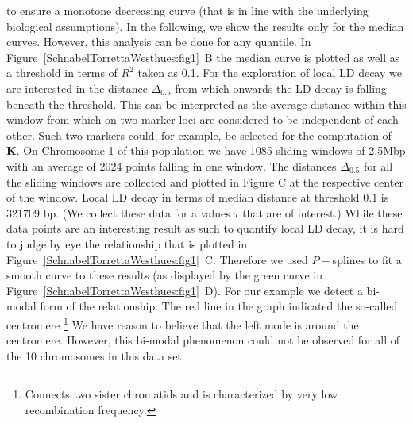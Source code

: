 \documentclass[twoside]{report}
\begin{document}
	to ensure a monotone decreasing curve (that is 
	in line with the underlying biological assumptions). In the following, we show the 
	results only for the median curves. However, this analysis can be done for any quantile.  
	In Figure~\ref{SchnabelTorrettaWesthues:fig1}~B the median curve is 
	plotted as well as a threshold in terms of $R^2$ taken as 
	0.1. For the exploration of local LD decay we are interested in the distance $\Delta_{0.5}$ from 
	which onwards the LD decay is falling beneath the threshold. This can be interpreted as the
	average distance within this window from which on two marker loci are considered to be 
	independent of each other. Such two markers could, for example, be selected for the computation
	of \textbf{K}.
	On Chromosome 1 of this population we have 1085 sliding windows
	 of 2.5Mbp with an 
	average of 2024 points falling in one window. The distances 
	$\Delta_{0.5}$ for all the sliding windows are collected and plotted in Figure C 
	at the respective center of the window. Local 
	LD decay in terms of median distance at threshold 0.1 is 321709 bp. 
	(We collect these data for a 
	values $\tau$ that are of interest.) While these data points are an interesting result as
	such to quantify local LD decay, it is hard to judge by eye the relationship that is plotted in 
	Figure~\ref{SchnabelTorrettaWesthues:fig1}~C. Therefore we used $P-$splines to fit a smooth curve to these results (as 
	displayed by the green curve in Figure~\ref{SchnabelTorrettaWesthues:fig1}~D). For our example we detect a bi-modal form of the 
	relationship. The red line in the graph indicated the so-called centromere 
	\footnote{Connects two sister chromatids and is characterized by very low recombination frequency.} 
	We have reason to believe that the left mode is around the centromere.   
	However, this bi-modal phenomenon could not be observed for 
	all of the 10 chromosomes in this data set.   
%
\end{document}
